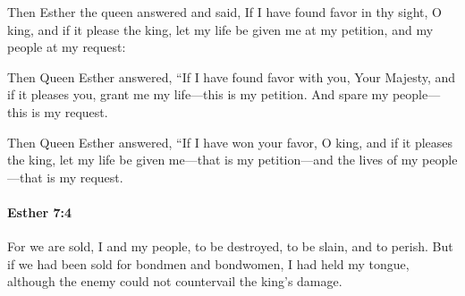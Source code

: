 			\begin{versebox}
					\item[BHS] 
					\item[LXX] 
					\item[ASV] Then Esther the queen answered and said, If I have found favor in thy sight, O king, and if it please the king, let my life be given me at my petition, and my people at my request:
					\item[NIV] Then Queen Esther answered, “If I have found favor with you, Your Majesty, and if it pleases you, grant me my life—this is my petition. And spare my people—this is my request.
					\item[NRSV] Then Queen Esther answered, “If I have won your favor, O king, and if it pleases the king, let my life be given me—that is my petition—and the lives of my people—that is my request.
			\end{versebox}

		\paragraph{Esther 7:4} %
			\label{ESTHER-7-4}

			For we are sold, I and my people, to be destroyed, to be slain, and to perish. But if we had been sold for bondmen and bondwomen, I had held my tongue, although the enemy could not countervail the king’s damage.


